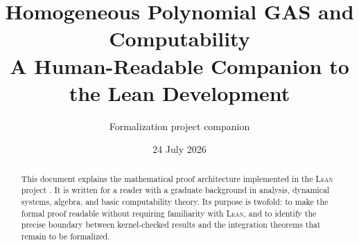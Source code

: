 \documentclass[11pt]{article}
\title{\textbf{Homogeneous Polynomial GAS and Computability}\\
  A Human-Readable Companion to the Lean Development}
\author{Formalization project companion}
\date{24 July 2026}
\newcommand{\Lean}{\textsc{Lean}}
\newcommand{\leanmodule}[1]{\path{#1}}
\begin{document}
\maketitle

\begin{center}
\end{center}

\begin{abstract}
This document explains the mathematical proof architecture implemented in
the \Lean{} project \leanmodule{lean/HGAS}.  It is written for a reader with
a graduate background in analysis, dynamical systems, algebra, and basic
computability theory.  Its purpose is twofold: to make the formal proof
readable without requiring familiarity with \Lean{}, and to identify the
precise boundary between kernel-checked results and the integration theorems
that remain to be formalized.


\end{abstract}
\end{document}
